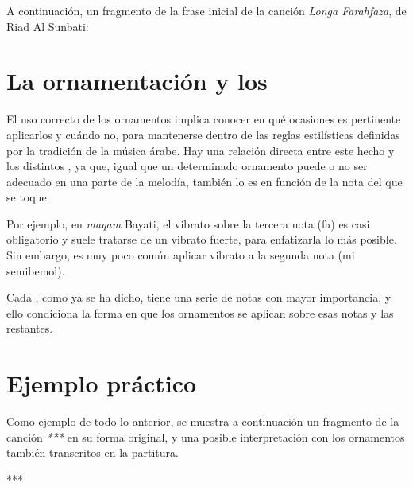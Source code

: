 
A continuación, un fragmento de la frase inicial de la canción \emph{Longa Farahfaza}, de Riad Al Sunbati:

\begin{center}
\end{center}



\section{La ornamentación y los \maqamaat}

  El uso correcto de los ornamentos implica conocer en qué ocasiones es pertinente aplicarlos y cuándo no, para mantenerse dentro de las reglas estilísticas definidas por la tradición de la música árabe. Hay una relación directa entre este hecho y los distintos \maqamaat, ya que, igual que un determinado ornamento puede o no ser adecuado en una parte de la melodía, también lo es en función de la nota del \maqam que se toque.

  Por ejemplo, en \emph{maqam} Bayati, el vibrato sobre la tercera nota (fa) es casi obligatorio y suele tratarse de un vibrato fuerte, para enfatizarla lo más posible. Sin embargo, es muy poco común aplicar vibrato a la segunda nota (mi semibemol).

  Cada \maqam, como ya se ha dicho, tiene una serie de notas con mayor importancia, y ello condiciona la forma en que los ornamentos se aplican sobre esas notas y las restantes.

\section{Ejemplo práctico}

Como ejemplo de todo lo anterior, se muestra a continuación un fragmento de la canción \emph{***} en su forma original, y una posible interpretación con los ornamentos también transcritos en la partitura.

***

\thispagestyle{empty}